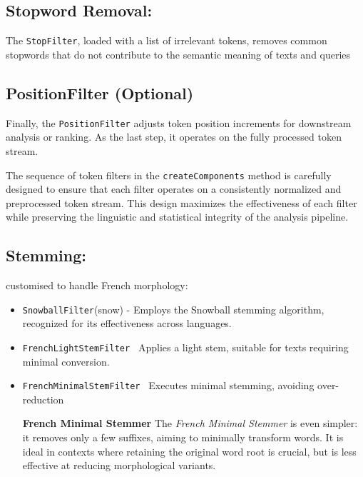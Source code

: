 \subsection{Stopword Removal:} The \texttt{StopFilter}, loaded with a list of irrelevant tokens, removes common stopwords that do not contribute to the semantic meaning of texts and queries

\subsection{PositionFilter (Optional)}
Finally, the \texttt{PositionFilter} adjusts token position increments for downstream analysis or ranking. As the last step, it operates on the fully processed token stream.

The sequence of token filters in the \texttt{createComponents} method is carefully designed to ensure that each filter operates on a consistently normalized and preprocessed token stream. This design maximizes the effectiveness of each filter while preserving the linguistic and statistical integrity of the analysis pipeline.


\subsection{Stemming:} customised to handle French morphology:
    \begin{itemize}
        \item \texttt{SnowballFilter}(snow) - Employs the Snowball stemming algorithm, recognized for its effectiveness across languages.
        \item \texttt{FrenchLightStemFilter }  Applies a light stem, suitable for texts requiring minimal conversion.
        \item \texttt{FrenchMinimalStemFilter } Executes minimal stemming, avoiding over-reduction

\vspace{0.2cm}
\textbf{French Minimal Stemmer}  
The \textit{French Minimal Stemmer} is even simpler: it removes only a few suffixes, aiming to minimally transform words. It is ideal in contexts where retaining the original word root is crucial, but is less effective at reducing morphological variants.

    \end{itemize}

